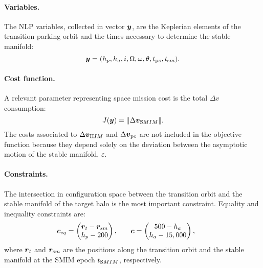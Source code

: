 \paragraph{Variables.}The {NLP} variables, collected in vector $\boldsymbol{y}$, are the Keplerian elements of the transition parking orbit and the times necessary to determine the stable manifold:
%
\begin{equation}
\boldsymbol{y} = (h_p,h_a,i,\Omega,\omega,\theta,t_{\textrm po},t_{\textrm sm}).
\end{equation}
%

\paragraph{Cost function.} A relevant parameter representing space mission cost is the total $\Delta v$ consumption:
%
\begin{equation}
J(\boldsymbol{y}) = \|\Delta\boldsymbol{v}_{\textrm SMIM}\|.
\end{equation}
%
The costs associated to $\Delta\boldsymbol{v}_{\textrm HIM}$ and $\Delta\boldsymbol{v}_{\textrm pc}$ are not included in the objective function because they depend solely on the deviation between the asymptotic motion of the stable manifold, \ie $\varepsilon$.

\paragraph{Constraints.} 
The intersection in configuration space between the transition orbit and the stable manifold of the target halo is the most important constraint. Equality and inequality constraints are:
%
\begin{align}
&\begin{aligned}
\boldsymbol{c}_{eq} &= \begin{pmatrix}
\boldsymbol{r}_t-\boldsymbol{r}_{\textrm sm} \\
h_p-200
\end{pmatrix},
\end{aligned}
&
&\begin{aligned}
\boldsymbol{c} &= \begin{pmatrix}
500-h_a \\
h_a-15,000
\end{pmatrix},
\end{aligned}
\end{align}
%
where $\boldsymbol{r}_t$ and $\boldsymbol{r}_{\textrm sm}$ are the positions along the transition orbit and the stable manifold at the SMIM epoch $t_{\textrm SMIM}$, respectively.
%
